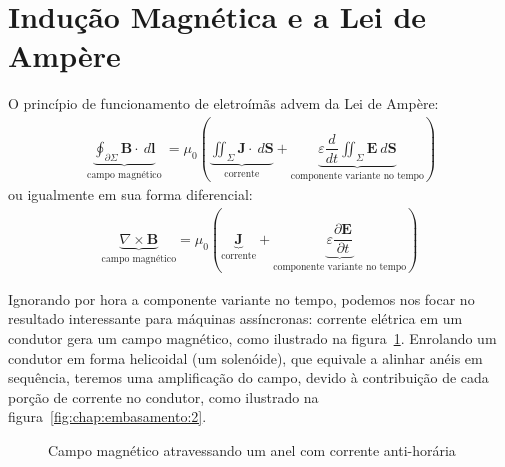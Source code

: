 \documentclass[
        12pt,                           %
        openright,                      %
        twoside,                        %
        a4paper,                        %
        english,                        %
        french,                         %
        spanish,                        %
        brazil                          %
        ]{abntex2}
\begin{document}
\section{Indução Magnética e a Lei de Ampère}
O princípio de funcionamento de eletroímãs advem da Lei de Ampère:
\begin{gather}
  \underbrace{ \oint_{\partial \Sigma} \bm{B} \cdot \: d{\bm{l}} }_\text{ campo magnético } = \mu_0 \left( \underbrace{ \iint_{\Sigma} \bm{J} \cdot \: d{\bm{S}} }_\text{corrente} + \underbrace{ \varepsilon \dfrac{d}{dt} \iint_{\Sigma} \bm{E} \: d{\bm{S}} }_\text{componente variante no tempo}  \right)
\end{gather}
ou igualmente em sua forma diferencial:
\begin{gather}
  \underbrace{\nabla \times \bm{B}}_\text{campo magnético} = \mu_0 \left( \underbrace{\bm{J}}_\text{corrente} + \underbrace{\varepsilon \dfrac{\partial \bm{E}}{\partial t}}_\text{componente variante no tempo} \right) 
\end{gather}

Ignorando por hora a componente variante no tempo, podemos nos focar no resultado
interessante para máquinas assíncronas: corrente elétrica em um condutor gera um
campo magnético, como ilustrado na figura~\ref{fig:chap:embasamento:1}. Enrolando
um condutor em forma helicoidal (um solenóide), que equivale a alinhar anéis em
sequência, teremos uma amplificação do campo, devido à contribuição de cada porção
de corrente no condutor, como ilustrado na figura~\ref{fig:chap:embasamento:2}.

\begin{figure}[htp]
  \centering
{}
\caption{Campo magnético atravessando um anel com corrente anti-horária}
\label{fig:chap:embasamento:1}
\end{figure}
\end{document}
